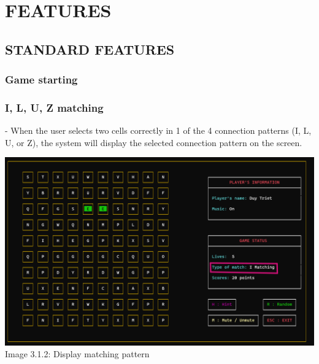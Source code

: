 \documentclass[12pt,a4paper]{report}
\begin{document}
\chapter{FEATURES}
\section{STANDARD FEATURES}
\subsection{Game starting}

\newpage
\subsection{I, L, U, Z matching}
- When the user selects two cells correctly in 1 of the 4 connection patterns (I, L, U, or Z), the system will display the selected connection pattern on the screen.\\
\begin{center}
    \includegraphics[scale=0.3]{Display matching pattern.png}\\[0.2cm]
    Image 3.1.2: Display matching pattern
\end{center}
\end{document}

